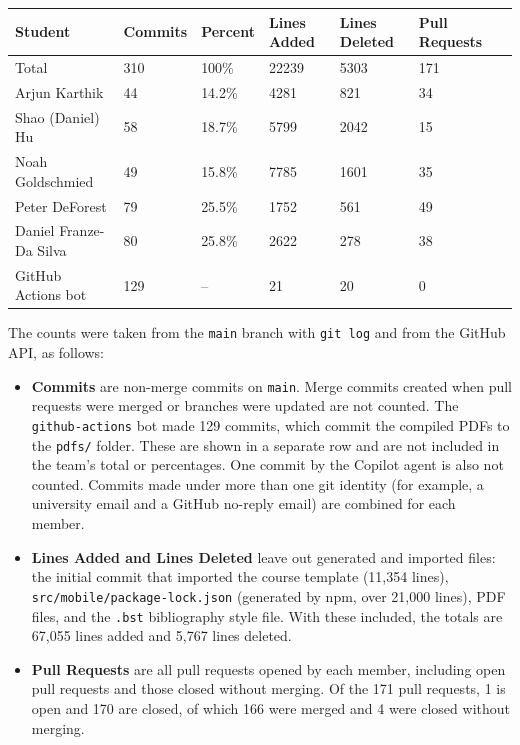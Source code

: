 \documentclass{article}
\begin{document}
\begin{table}[H]
\centering
\begin{tabular}{lllllll}
\toprule
\textbf{Student} & \textbf{Commits} & \textbf{Percent} & \textbf{Lines Added} &
\textbf{Lines Deleted} & \textbf{Pull Requests}\\
\midrule
Total & 310 & 100\% & 22239 & 5303 & 171\\
Arjun Karthik & 44 & 14.2\% & 4281 & 821 & 34\\
Shao (Daniel) Hu & 58 & 18.7\% & 5799 & 2042 & 15\\
Noah Goldschmied & 49 & 15.8\% & 7785 & 1601 & 35\\
Peter DeForest & 79 & 25.5\% & 1752 & 561 & 49\\
Daniel Franze-Da Silva & 80 & 25.8\% & 2622 & 278 & 38\\
\midrule
GitHub Actions bot & 129 & -- & 21 & 20 & 0\\
\bottomrule
\end{tabular}
\end{table}

The counts were taken from the \texttt{main} branch with \texttt{git log} and
from the GitHub API, as follows:
\begin{itemize}
    \item \textbf{Commits} are non-merge commits on \texttt{main}. Merge commits
    created when pull requests were merged or branches were updated are not
    counted. The \texttt{github-actions} bot made 129 commits, which commit
    the compiled PDFs to the \texttt{pdfs/} folder. These are shown in a
    separate row and are not included in the team's total or percentages.
    One commit by the Copilot agent is also not counted. Commits made under more than one git identity (for example, a
    university email and a GitHub no-reply email) are combined for each
    member.
    \item \textbf{Lines Added and Lines Deleted} leave out generated and
    imported files: the initial commit that imported the course template
    (11,354 lines), \texttt{src/mobile/package-lock.json} (generated by npm,
    over 21,000 lines), PDF files, and the \texttt{.bst} bibliography style
    file. With these included, the totals are 67,055 lines added and 5,767
    lines deleted.
    \item \textbf{Pull Requests} are all pull requests opened by each member,
    including open pull requests and those closed without merging. Of the
    171 pull requests, 1 is open and 170 are closed, of which 166 were merged
    and 4 were closed without merging.
\end{itemize}
\end{document}
